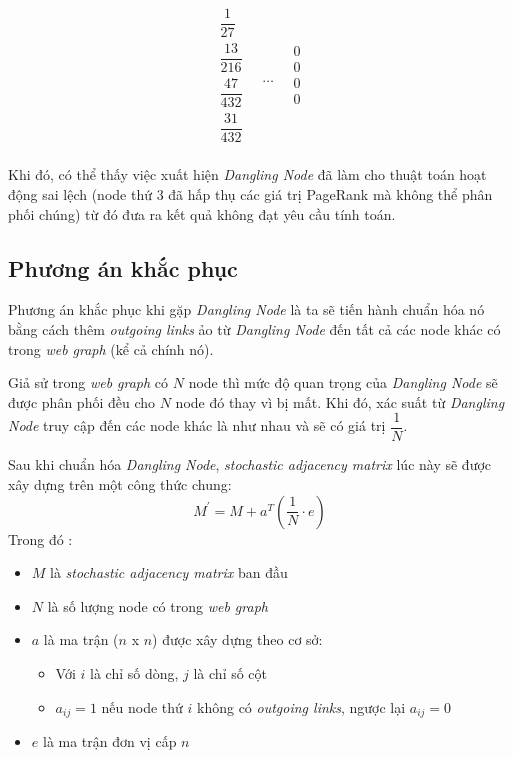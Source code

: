 \begin{itemize}
$$\begin{matrix}
                    \dfrac{1}{27} \\[10pt]
                    \dfrac{13}{216} \\[10pt]
                    \dfrac{47}{432}\\[10pt]
                    \dfrac{31}{432} \\[10pt]
                \end{matrix}
                \quad
                \ldots
                \quad
                \begin{matrix}
                    0\\[10pt]
                    0\\[10pt]
                    0\\[10pt]
                    0\\
                \end{matrix}
                $$ 
\end{itemize}
Khi đó, có thể thấy việc xuất hiện \emph{Dangling Node} đã làm cho thuật toán hoạt động sai lệch (node thứ 3 đã hấp thụ các giá trị PageRank mà không thể phân phối chúng) từ đó đưa ra kết quả không đạt yêu cầu tính toán.

\subsection{Phương án khắc phục}
Phương án khắc phục khi gặp \emph{Dangling Node} là ta sẽ tiến hành chuẩn hóa nó bằng cách thêm \emph{outgoing links} ảo từ \emph{Dangling Node} đến tất cả các node khác có trong \emph{web graph} (kể cả chính nó). 

Giả sử trong \emph{web graph} có $N$ node thì mức độ quan trọng của \emph{Dangling Node}  sẽ được phân phối đều cho $N$ node đó thay vì bị mất. Khi đó, xác suất từ \emph{Dangling Node} truy cập đến các node khác là như nhau và sẽ có giá trị $\dfrac{1}{N}$.

 Sau khi chuẩn hóa \emph{Dangling Node}, \emph{stochastic adjacency matrix} lúc này sẽ được xây dựng trên một công thức chung:\cite{Youtube_Dangling_Node} \\
 
           $$
                M^{'} = M + a^T\left(\dfrac{1}{N} \cdot e\right)
            $$
    Trong đó : 
    \begin{itemize}
        \item $M$ là \textit{stochastic adjacency matrix} ban đầu
        \item $N$ là số lượng node có trong \emph{web graph}
        \item $a$ là ma trận ($n$ x $n$) được xây dựng theo cơ sở:
            \begin{itemize}
                \item Với $i$ là chỉ số dòng, $j$ là chỉ số cột
                \item $a_{ij}=1$ nếu node thứ $i$ không có \emph{outgoing links}, ngược lại $a_{ij}=0$
            \end{itemize}      
        \item $e$ là ma trận đơn vị cấp $n$
   \end{itemize}
    
